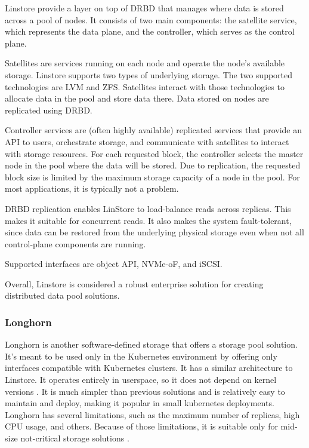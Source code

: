 Linstore provide a layer on top of DRBD that manages where data is stored across a pool of nodes. It consists of two main components: the satellite service, which represents the data plane, and the controller, which serves as the control plane.

Satellites are services running on each node and operate the node's available storage. Linstore supports two types of underlying storage. The two supported technologies are LVM and ZFS. Satellites interact with those technologies to allocate data in the pool and store data there. Data stored on nodes are replicated using DRBD.

Controller services are (often highly available) replicated services that provide an API to users, orchestrate storage, and communicate with satellites to interact with storage resources. For each requested block, the controller selects the master node in the pool where the data will be stored. Due to replication, the requested block size is limited by the maximum storage capacity of a node in the pool. For most applications, it is typically not a problem.

DRBD replication enables LinStore to load-balance reads across replicas. This makes it suitable for concurrent reads. It also makes the system fault-tolerant, since data can be restored from the underlying physical storage even when not all control-plane components are running.

Supported interfaces are object API, NVMe-oF, and iSCSI. \cite{linbit_linstor_2026}

\vspace{1.5em} %
Overall, Linstore is considered a robust enterprise solution for creating distributed data pool solutions. 

\subsubsection{Longhorn}
Longhorn is another software-defined storage that offers a storage pool solution. It's meant to be used only in the Kubernetes environment by offering only interfaces compatible with Kubernetes clusters. It has a similar architecture to Linstore. It operates entirely in userspace, so it does not depend on kernel versions \cite{anderson_kubernetes_2025}. It is much simpler than previous solutions and is relatively easy to maintain and deploy, making it popular in small kubernetes deployments. Longhorn has several limitations, such as the maximum number of replicas, high CPU usage, and others\cite{simplyblock_what_2024}. Because of those limitations, it is suitable only for mid-size not-critical storage solutions \cite{longhorn_authors_longhorn_2026-1}.

